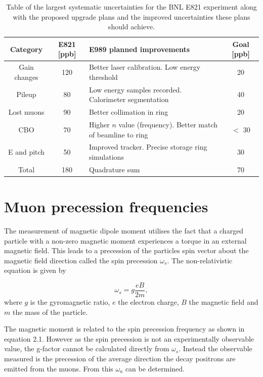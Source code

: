 \begin{table}[htbp]
\begin{center}
 \begin{tabular}{||c | c | m{5cm} | c||} 
 \hline
 Category & E821 [ppb] & E989 planned improvements & Goal [ppb]\\ [0.5ex] 
 \hline\hline
 Gain changes & 120 & Better laser calibration. Low energy threshold & 20\\ 
 \hline
 Pileup & 80 & Low energy samples recorded. Calorimeter segmentation & 40 \\
 \hline
 Lost muons & 90 & Better collimation in ring & 20 \\
 \hline
 CBO & 70 & Higher $n$ value (frequency). Better match of beamline to ring & $<$ 30 \\
 \hline
 E and pitch & 50 & Improved tracker. Precise storage ring simulations & 30 \\ 
 \hline
 Total & 180 & Quadrature sum & 70  \\ [1ex] 
 \hline
\end{tabular}
\caption{Table of the largest systematic uncertainties for the BNL E821 experiment along with the proposed upgrade plans and the improved uncertainties these plans should achieve\cite{Reference29}.}
\label{table:bnl_systematics}
\end{center}
\end{table}

\section{Muon precession frequencies}

The measurement of magnetic dipole moment utilises the fact that a charged particle with a non-zero magnetic moment experiences a torque in an external magnetic field. This leads to a precession of the particles spin vector about the magnetic field direction called the spin precession $\omega_{s}$. The non-relativistic equation is given by

\begin{equation}
\omega_{s} = g\frac{eB}{2m},
\end{equation}
where $g$ is the gyromagnetic ratio, $e$ the electron charge, $B$ the magnetic field and $m$ the mass of the particle.

The magnetic moment is related to the spin precession frequency as shown in equation 2.1. However as the spin precession is not an experimentally observable value, the g-factor cannot be calculated directly from $\omega_{s}$. Instead the observable measured is the precession of the average direction the decay positrons are emitted from the muons. From this $\omega_{a}$ can be determined.

